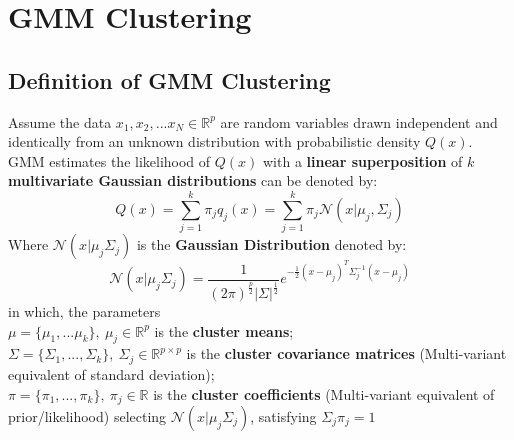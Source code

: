 \documentclass{article}
\begin{document}

\section{GMM Clustering}

\subsection{Definition of GMM Clustering}
Assume the data $x_1,x_2,...x_N \in \mathbb{R}^{p}$ are random variables drawn independent and identically from an unknown distribution with probabilistic density $Q(x)$. GMM estimates the likelihood of $Q(x)$ with a \textbf{linear superposition} of $k$ \textbf{multivariate Gaussian distributions} can be denoted by:\[
Q(x) = \sum_{j=1}^{k}\pi_{j}q_{j}(x)=\sum_{j=1}^{k}\pi_{j}\mathcal{N}   (x|\mu_{j},\Sigma_{j})
\]
Where $\mathcal{N}(x|\mu_{j}\Sigma_{j})$ is the \textbf{Gaussian Distribution} denoted by:\[
\mathcal{N}(x|\mu_{j}\Sigma_{j})=\frac{1}{(2\pi)^{\frac{p}{2}}|\Sigma|^{\frac{1}{2}}}e^{-\frac{1}{2}(x-\mu_{j})^{T}\Sigma_{j}^{-1}(x-\mu_{j})}
\]
in which, the parameters\\
$\mu = \{\mu_1,...\mu_k\}, \: \mu_{j} \in \mathbb{R}^{p}$ is the \textbf{cluster means};\\
$\Sigma = \{\Sigma_1,...,\Sigma_k\}, \: \Sigma_{j} \in \mathbb{R}^{p\times p}$ is the \textbf{cluster covariance matrices} (Multi-variant equivalent of standard deviation);\\
$\pi = \{\pi_1,...,\pi_k\}, \: \pi_{j}\in \mathbb{R}$ is the \textbf{cluster coefficients} (Multi-variant equivalent of prior/likelihood) selecting $\mathcal{N}(x|\mu_{j}\Sigma_{j})$, satisfying $\Sigma_{j}\pi_{j} = 1$\\
\end{document}
